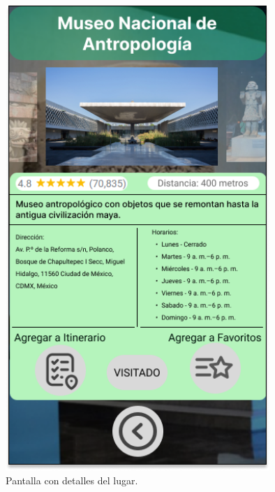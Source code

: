 \begin{figure}[htb]
    \centering
    \includegraphics[width=10cm]{pantalla8.png}
    \caption{Pantalla con detalles del lugar.}
    \label{fig:enter-label}
\end{figure}

